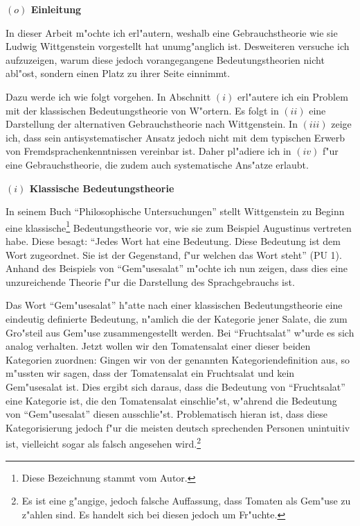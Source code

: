 \documentclass[a4paper, emulatestandardclasses, 12pt]{scrartcl}
\begin{document}
\begin{onehalfspace} 

\noindent\textbf{$(o)$ Einleitung}

\noindent In dieser Arbeit m"ochte ich erl"autern, weshalb eine Gebrauchstheorie wie sie Ludwig Wittgenstein vorgestellt hat unumg"anglich ist. Desweiteren versuche ich aufzuzeigen, warum diese jedoch vorangegangene Bedeutungstheorien nicht abl"ost, sondern einen Platz zu ihrer Seite einnimmt. 

Dazu werde ich wie folgt vorgehen. In Abschnitt $(i)$ erl"autere ich ein Problem mit der klassischen Bedeutungstheorie von W"ortern. Es folgt in $(ii)$ eine Darstellung der alternativen Gebrauchstheorie nach Wittgenstein. In $(iii)$ zeige ich, dass sein antisystematischer Ansatz jedoch nicht mit dem typischen Erwerb von Fremdsprachenkenntnissen vereinbar ist. Daher pl"adiere ich in $(iv)$ f"ur eine Gebrauchstheorie, die zudem auch systematische Ans"atze erlaubt. 
\vspace{5mm}

\noindent\textbf{$(i)$ Klassische Bedeutungstheorie}

\noindent In seinem Buch "`Philosophische Untersuchungen"' \citep{wittgenstein1963tractatus} stellt Wittgenstein zu Beginn eine klassische\footnote{Diese Bezeichnung stammt vom Autor.} Bedeutungstheorie vor, wie sie zum Beispiel Augustinus vertreten habe. Diese besagt: "`Jedes Wort hat eine Bedeutung. Diese Bedeutung ist dem Wort zugeordnet. Sie ist der Gegenstand, f"ur welchen das Wort steht"' (PU 1). Anhand des Beispiels von "`Gem"usesalat"' m"ochte ich nun zeigen, dass dies eine unzureichende Theorie f"ur die Darstellung des Sprachgebrauchs ist.

Das Wort "`Gem"usesalat"' h"atte nach einer klassischen Bedeutungstheorie eine eindeutig definierte Bedeutung, n"amlich die der Kategorie jener Salate, die zum Gro"steil aus Gem"use zusammengestellt werden. Bei "`Fruchtsalat"' w"urde es sich analog verhalten. Jetzt wollen wir den Tomatensalat einer dieser beiden Kategorien zuordnen: Gingen wir von der genannten Kategoriendefinition aus, so m"ussten wir sagen, dass der Tomatensalat ein Fruchtsalat und kein Gem"usesalat ist. Dies ergibt sich daraus, dass die Bedeutung von "`Fruchtsalat"' eine Kategorie ist, die den Tomatensalat einschlie"st, w"ahrend die Bedeutung von "`Gem"usesalat"' diesen ausschlie"st. Problematisch hieran ist, dass diese Kategorisierung jedoch f"ur die meisten deutsch sprechenden Personen unintuitiv ist, vielleicht sogar als falsch angesehen wird.\footnote{Es ist eine g"angige, jedoch falsche Auffassung, dass Tomaten als Gem"use zu z"ahlen sind. Es handelt sich bei diesen jedoch um Fr"uchte.} 


\end{onehalfspace}
\end{document}
